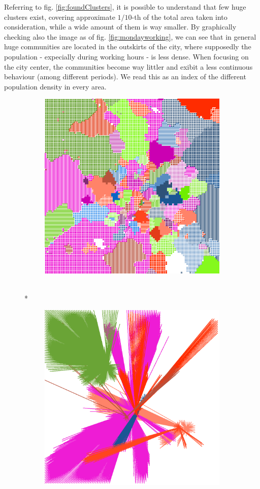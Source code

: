 \documentclass[12pt,a4paper]{article}
\begin{document}
Referring to fig. \ref{fig:foundClusters}, it is possible to understand that few huge clusters exist, covering approximate $1/10$-th of the total area taken into consideration, while a wide amount of them is way smaller.
By graphically checking also the image as of fig. \ref{fig:mondayworking}, we can see that in general huge communities are located in the outskirts of the city, where supposedly the population - expecially during working hours - is less dense. When focusing on the city center, the communities become way littler and exibit a less continuous behaviour (among different periods). We read this as an index of the different population density in every area.

\begin{figure}[H]
\begin{subfigure}[b]{\textwidth}
\centering
\includegraphics[width=0.8\linewidth]{weekDef/1Mon.png}
\caption{}
\end{subfigure}
\\*
\begin{subfigure}[b]{0.3\textwidth}
\includegraphics[width=\textwidth]{weekDef/edges-1Mon-big.png}

\end{subfigure}
\end{figure}
\end{document}
